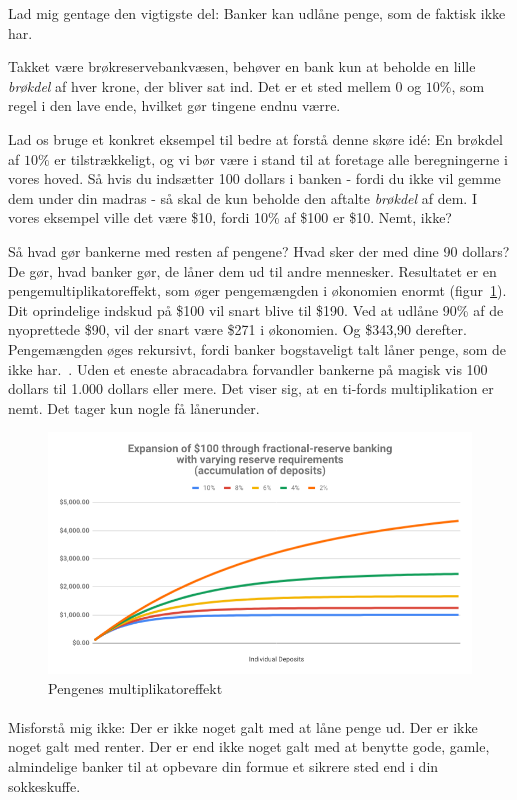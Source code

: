 \documentclass[paper=6in:9in,pagesize=pdftex,
               headinclude=on,footinclude=on,12pt]{scrbook}
\begin{document}
Lad mig gentage den vigtigste del: Banker kan udlåne penge, som de faktisk ikke har.

Takket være brøkreservebankvæsen, behøver en bank kun at beholde en lille \textit{brøkdel} af hver krone, der bliver sat ind. Det er et sted mellem $0$ og $10\%$, som regel i den lave ende, hvilket gør tingene endnu værre.

Lad os bruge et konkret eksempel til bedre at forstå denne skøre id\'e: En brøkdel af $10\%$ er tilstrækkeligt, og vi bør være i stand til at foretage alle beregningerne i vores hoved. Så hvis du indsætter 100 dollars i banken - fordi du ikke vil gemme dem under din madras - så skal de kun beholde den aftalte \textit{brøkdel} af dem. I vores eksempel ville det være \$10, fordi 10\% af \$100 er \$10. Nemt, ikke?

Så hvad gør bankerne med resten af pengene? Hvad sker der med dine 90 dollars? De gør, hvad banker gør, de låner dem ud til andre mennesker. Resultatet er en pengemultiplikatoreffekt, som øger pengemængden i økonomien enormt (figur~\ref{fig:money-multiplier}). Dit oprindelige indskud på \$100 vil snart blive til \$190. Ved at udlåne 90\% af de nyoprettede \$90, vil der snart være \$271 i økonomien. Og \$343,90 derefter. Pengemængden øges rekursivt, fordi banker bogstaveligt talt låner penge, som de ikke har.~\cite{wiki:money-multiplier}. Uden et eneste abracadabra forvandler bankerne på magisk vis 100 dollars til 1.000 dollars eller mere. Det viser sig, at en ti-fords multiplikation er nemt. Det tager kun nogle få lånerunder.\begin{figure}
  \centering
  \includegraphics{assets/images/money-multiplier.png}
  \caption{Pengenes multiplikatoreffekt}
  \label{fig:money-multiplier}
\end{figure}

\paragraph{} Misforstå mig ikke: Der er ikke noget galt med at låne penge ud. Der er ikke noget galt med renter. Der er end ikke noget galt med at benytte gode, gamle, almindelige banker til at opbevare din formue et sikrere sted end i din sokkeskuffe.
\end{document}
